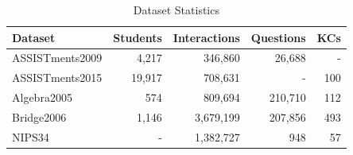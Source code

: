 \begin{table}[htbp]
\centering
\caption{Dataset Statistics}
\label{tab:dataset_statistics}
\begin{tabular}{lrrrr}
\toprule
\textbf{Dataset} & \textbf{Students} & \textbf{Interactions} & \textbf{Questions} & \textbf{KCs} \\
\midrule
ASSISTments2009 & 4,217 & 346,860 & 26,688 & - \\
ASSISTments2015 & 19,917 & 708,631 & - & 100 \\
Algebra2005 & 574 & 809,694 & 210,710 & 112 \\
Bridge2006 & 1,146 & 3,679,199 & 207,856 & 493 \\
NIPS34 & - & 1,382,727 & 948 & 57 \\
\bottomrule
\end{tabular}
\end{table}
